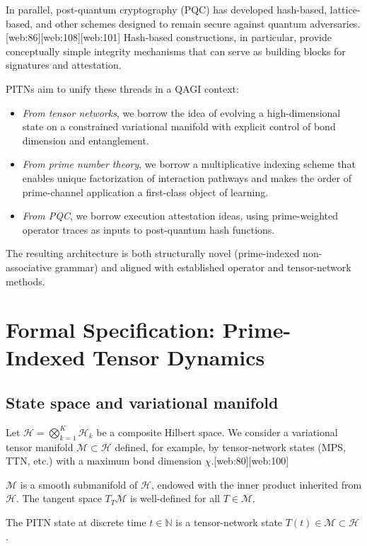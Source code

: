 \documentclass[11pt]{article}
\begin{document}
In parallel, post-quantum cryptography (PQC) has developed hash-based, lattice-based, and other schemes designed to remain secure against quantum adversaries.[web:86][web:108][web:101] Hash-based constructions, in particular, provide conceptually simple integrity mechanisms that can serve as building blocks for signatures and attestation.

PITNs aim to unify these threads in a QAGI context:
\begin{itemize}[leftmargin=*]
  \item \emph{From tensor networks}, we borrow the idea of evolving a high-dimensional state on a constrained variational manifold with explicit control of bond dimension and entanglement.
  \item \emph{From prime number theory}, we borrow a multiplicative indexing scheme that enables unique factorization of interaction pathways and makes the order of prime-channel application a first-class object of learning.
  \item \emph{From PQC}, we borrow execution attestation ideas, using prime-weighted operator traces as inputs to post-quantum hash functions.
\end{itemize}

The resulting architecture is both structurally novel (prime-indexed non-associative grammar) and aligned with established operator and tensor-network methods.

\section{Formal Specification: Prime-Indexed Tensor Dynamics}

\subsection{State space and variational manifold}

Let \( \mathcal{H} = \bigotimes_{k=1}^K \mathcal{H}_k \) be a composite Hilbert space. We consider a variational tensor manifold \( \mathcal{M} \subset \mathcal{H} \) defined, for example, by tensor-network states (MPS, TTN, etc.) with a maximum bond dimension \( \chi \).[web:80][web:100] 

\begin{description}[leftmargin=2em]
\item[Assumption 1 (Smooth variational manifold).] 
\( \mathcal{M} \) is a smooth submanifold of \( \mathcal{H} \), endowed with the inner product inherited from \( \mathcal{H} \). The tangent space \( T_T\mathcal{M} \) is well-defined for all \( T \in \mathcal{M} \).

\item[State variable.] 
The PITN state at discrete time \( t \in \mathbb{N} \) is a tensor-network state \( T(t) \in \mathcal{M} \subset \mathcal{H} \).

\end{description}
\end{document}
